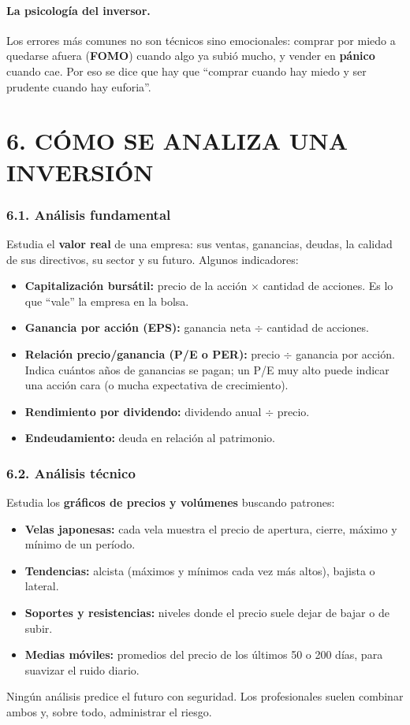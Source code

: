 \paragraph*{La psicología del inversor.}
Los errores más comunes no son técnicos sino emocionales: comprar por miedo a quedarse afuera
(\textbf{FOMO}) cuando algo ya subió mucho, y vender en \textbf{pánico} cuando cae. Por eso se
dice que hay que ``comprar cuando hay miedo y ser prudente cuando hay euforia''.

\section*{6. CÓMO SE ANALIZA UNA INVERSIÓN}

\subsubsection*{6.1. Análisis fundamental}
Estudia el \textbf{valor real} de una empresa: sus ventas, ganancias, deudas, la calidad de sus
directivos, su sector y su futuro. Algunos indicadores:
\begin{itemize}
  \item \textbf{Capitalización bursátil:} precio de la acción $\times$ cantidad de acciones. Es
        lo que ``vale'' la empresa en la bolsa.
  \item \textbf{Ganancia por acción (EPS):} ganancia neta $\div$ cantidad de acciones.
  \item \textbf{Relación precio/ganancia (P/E o PER):} precio $\div$ ganancia por acción. Indica
        cuántos años de ganancias se pagan; un P/E muy alto puede indicar una acción cara (o
        mucha expectativa de crecimiento).
  \item \textbf{Rendimiento por dividendo:} dividendo anual $\div$ precio.
  \item \textbf{Endeudamiento:} deuda en relación al patrimonio.
\end{itemize}

\subsubsection*{6.2. Análisis técnico}
Estudia los \textbf{gráficos de precios y volúmenes} buscando patrones:
\begin{itemize}
  \item \textbf{Velas japonesas:} cada vela muestra el precio de apertura, cierre, máximo y mínimo
        de un período.
  \item \textbf{Tendencias:} alcista (máximos y mínimos cada vez más altos), bajista o lateral.
  \item \textbf{Soportes y resistencias:} niveles donde el precio suele dejar de bajar o de subir.
  \item \textbf{Medias móviles:} promedios del precio de los últimos 50 o 200 días, para
        suavizar el ruido diario.
\end{itemize}
Ningún análisis predice el futuro con seguridad. Los profesionales suelen combinar ambos y,
sobre todo, administrar el riesgo.

